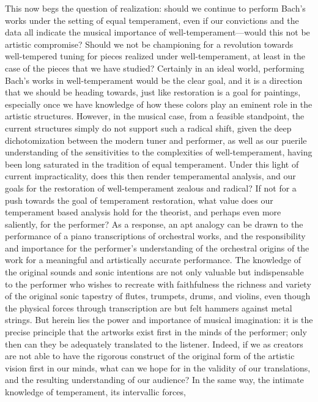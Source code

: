 This now begs the question of realization: should we continue to perform
Bach's works under the setting of equal temperament, even if our
convictions and the data all indicate the musical importance of
well-temperament---would this not be artistic compromise? Should we
not be championing for a revolution towards well-tempered tuning for
pieces realized under well-temperament, at least in the case of the
pieces that we have studied? Certainly in an ideal world, performing
Bach's works in well-temperament would be the clear goal, and it is a
direction that we should be heading towards, just like restoration is a
goal for paintings, especially once we have knowledge of how these
colors play an eminent role in the artistic structures. However, in the
musical case, from a feasible standpoint, the current structures simply
do not support such a radical shift, given the deep dichotomization
between the modern tuner and performer, as well as our puerile
understanding of the sensitivities to the complexities of
well-temperament, having been long saturated in the tradition of equal
temperament. Under this light of current impracticality, does this then
render temperamental analysis, and our goals for the restoration of
well-temperament zealous and radical? If not for a push towards the goal
of temperament restoration, what value does our temperament based
analysis hold for the theorist, and perhaps even more saliently, for the
performer? As a response, an apt analogy can be drawn to the performance
of a piano transcriptions of orchestral works, and the responsibility
and importance for the performer's understanding of the orchestral
origins of the work for a meaningful and artistically accurate
performance. The knowledge of the original sounds and sonic intentions
are not only valuable but indispensable to the performer who wishes to
recreate with faithfulness the richness and variety of the original
sonic tapestry of flutes, trumpets, drums, and violins, even though the
physical forces through transcription are but felt hammers against metal
strings. But herein lies the power and importance of musical
imagination: it is the precise principle that the artworks exist first
in the minds of the performer; only then can they be adequately
translated to the listener. Indeed, if we as creators are not able to
have the rigorous construct of the original form of the artistic vision
first in our minds, what can we hope for in the validity of our
translations, and the resulting understanding of our audience? In the
same way, the intimate knowledge of temperament, its intervallic forces,
